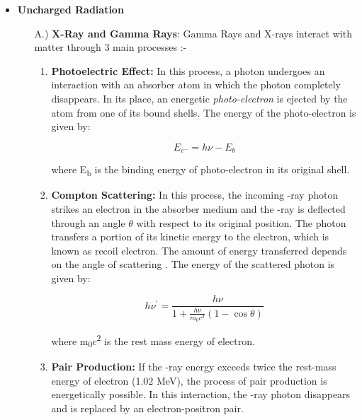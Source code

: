 \documentclass[../introduction.tex]{subfiles}
\begin{document}
    \begin{itemize}
        \item \textbf{Uncharged Radiation} 

        \begin{enumerate}

            \item[A.)] \textbf{X-Ray and Gamma Rays}: Gamma Rays and X-rays interact with matter through 3 main processes :-

            \begin{enumerate}
                \item \textbf{Photoelectric Effect: } In this process, a photon undergoes an interaction with an absorber atom 
                in which the photon completely disappears. In its place, an energetic \textit{photo-electron} is ejected 
                by the atom from one of its bound shells. The energy of the photo-electron is given by:

                $$E_{e^-}=h \nu - E_b $$

                where E\textsubscript{b} is the binding energy of photo-electron in its original shell.

                \item \textbf{Compton Scattering: } In this process, the incoming \textgamma-ray photon strikes an electron 
                in the absorber medium and the \textgamma-ray is deflected through an angle $\theta$ with respect to its original 
                position. The photon transfers a portion of its kinetic energy to the electron, which is known as recoil electron. 
                The amount of energy transferred depends on the angle of scattering \straighttheta. The energy of the 
                scattered photon is given by:

                $$ h\nu^{'}=\frac{h\nu}{1+\frac{h\nu}{m_{0}c^{2}}(1-\cos{\theta})}$$

                where m\textsubscript{0}c\textsuperscript{2}  is the rest mass energy of electron.

                \item \textbf{Pair Production: } If the \textgamma-ray energy exceeds twice the rest-mass energy of electron 
                (1.02 MeV), the process of pair production is energetically possible. In this interaction, the \textgamma-ray 
                photon disappears and is	replaced by an electron-positron pair.
            \end{enumerate}


\end{enumerate}
\end{itemize}
\end{document}
